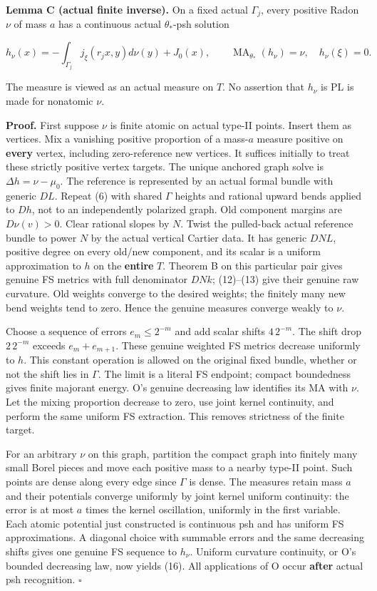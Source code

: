 \documentclass[
  11pt,
]{article}
\begin{document}
\textbf{Lemma C (actual finite inverse).} On a fixed actual
\(\Gamma_j\), every positive Radon \(\nu\) of mass \(a\) has a
continuous actual \(\theta_*\)-psh solution

\[
 h_\nu(x)=-\int_{\Gamma_j}j_\xi(r_jx,y)d\nu(y)+J_0(x),
 \qquad \operatorname{MA}_{\theta_*}(h_\nu)=\nu,\quad h_\nu(\xi)=0. \tag{16}
\]

The measure is viewed as an actual measure on \(T\). No assertion that
\(h_\nu\) is PL is made for nonatomic \(\nu\).

\textbf{Proof.} First suppose \(\nu\) is finite atomic on actual type-II
points. Insert them as vertices. Mix a vanishing positive proportion of
a mass-\(a\) measure positive on \textbf{every} vertex, including
zero-reference new vertices. It suffices initially to treat these
strictly positive vertex targets. The unique anchored graph solve is
\(\Delta h=\nu-\mu_0\). The reference is represented by an actual formal
bundle with generic \(DL\). Repeat (6) with shared \(\Gamma\) heights
and rational upward bends applied to \(Dh\), not to an independently
polarized graph. Old component margins are \(D\nu(v)>0\). Clear rational
slopes by \(N\). Twist the pulled-back actual reference bundle to power
\(N\) by the actual vertical Cartier data. It has generic \(DN L\),
positive degree on every old/new component, and its scalar is a uniform
approximation to \(h\) on the \textbf{entire} \(T\). Theorem B on this
particular pair gives genuine FS metrics with full denominator \(DNk\);
(12)--(13) give their genuine raw curvature. Old weights converge to the
desired weights; the finitely many new bend weights tend to zero. Hence
the genuine measures converge weakly to \(\nu\).

Choose a sequence of errors \(e_m\leq2^{-m}\) and add scalar shifts
\(4\,2^{-m}\). The shift drop \(2\,2^{-m}\) exceeds \(e_m+e_{m+1}\).
These genuine weighted FS metrics decrease uniformly to \(h\). This
constant operation is allowed on the original fixed bundle, whether or
not the shift lies in \(\Gamma\). The limit is a literal FS endpoint;
compact boundedness gives finite majorant energy. O's genuine decreasing
law identifies its MA with \(\nu\). Let the mixing proportion decrease
to zero, use joint kernel continuity, and perform the same uniform FS
extraction. This removes strictness of the finite target.

For an arbitrary \(\nu\) on this graph, partition the compact graph into
finitely many small Borel pieces and move each positive mass to a nearby
type-II point. Such points are dense along every edge since \(\Gamma\)
is dense. The measures retain mass \(a\) and their potentials converge
uniformly by joint kernel uniform continuity: the error is at most \(a\)
times the kernel oscillation, uniformly in the first variable. Each
atomic potential just constructed is continuous psh and has uniform FS
approximations. A diagonal choice with summable errors and the same
decreasing shifts gives one genuine FS sequence to \(h_\nu\). Uniform
curvature continuity, or O's bounded decreasing law, now yields (16).
All applications of O occur \textbf{after} actual psh recognition.
\(\square\)
\end{document}
